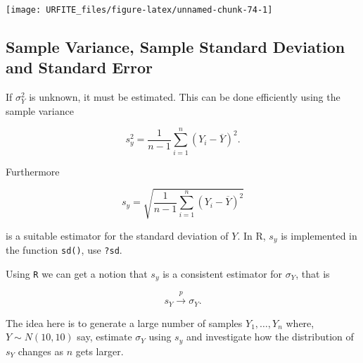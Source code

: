 \documentclass[]{book}
\theoremstyle{definition}
\theoremstyle{definition}
\theoremstyle{definition}
\theoremstyle{remark}
\begin{document}
\begin{center}\texttt{[image: URFITE\_files/figure-latex/unnamed-chunk-74-1]} \end{center}

\hypertarget{SVSSDASE}{\subsection*{Sample Variance, Sample Standard
Deviation and Standard Error}\label{SVSSDASE}}

If \(\sigma^2_Y\) is unknown, it must be estimated. This can be done
efficiently using the sample variance

\begin{equation}
s_y^2 = \frac{1}{n-1} \sum_{i=1}^n (Y_i - \overline{Y})^2.
\end{equation}

Furthermore

\begin{equation}
s_y = \sqrt{\frac{1}{n-1} \sum_{i=1}^n (Y_i - \overline{Y})^2}
\end{equation}

is a suitable estimator for the standard deviation of \(Y\). In R,
\(s_y\) is implemented in the function \texttt{sd()}, use \texttt{?sd}.

Using \texttt{R} we can get a notion that \(s_y\) is a consistent
estimator for \(\sigma_Y\), that is

\[ s_Y \overset{p}{\longrightarrow} \sigma_Y. \]

The idea here is to generate a large number of samples \(Y_1,\dots,Y_n\)
where, \(Y\sim N(10,10)\) say, estimate \(\sigma_Y\) using \(s_y\) and
investigate how the distribution of \(s_Y\) changes as \(n\) gets
larger.
\end{document}

